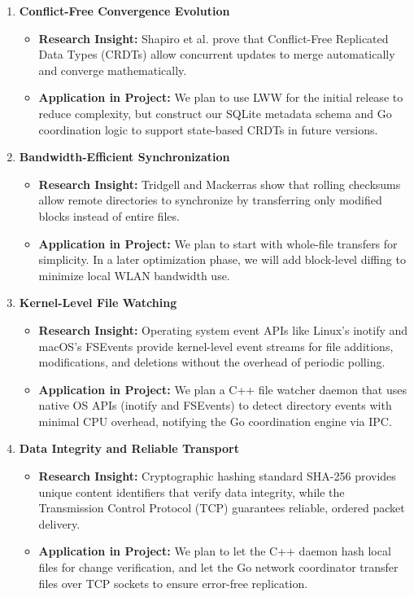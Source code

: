 \documentclass[11pt,oneside]{article}
\begin{document}
\begin{enumerate}
    \item \textbf{Conflict-Free Convergence Evolution}
    \begin{itemize}
        \item \textbf{Research Insight:} Shapiro et al. \cite{shapiro2011} prove that Conflict-Free Replicated Data Types (CRDTs) allow concurrent updates to merge automatically and converge mathematically.
        \item \textbf{Application in Project:} We plan to use LWW for the initial release to reduce complexity, but construct our SQLite metadata schema and Go coordination logic to support state-based CRDTs in future versions.
    \end{itemize}

    \item \textbf{Bandwidth-Efficient Synchronization}
    \begin{itemize}
        \item \textbf{Research Insight:} Tridgell and Mackerras \cite{rsync1996} show that rolling checksums allow remote directories to synchronize by transferring only modified blocks instead of entire files.
        \item \textbf{Application in Project:} We plan to start with whole-file transfers for simplicity. In a later optimization phase, we will add block-level diffing to minimize local WLAN bandwidth use.
    \end{itemize}

    \item \textbf{Kernel-Level File Watching}
    \begin{itemize}
        \item \textbf{Research Insight:} Operating system event APIs like Linux's inotify \cite{inotify7} and macOS's FSEvents \cite{fsevents} provide kernel-level event streams for file additions, modifications, and deletions without the overhead of periodic polling.
        \item \textbf{Application in Project:} We plan a C++ file watcher daemon that uses native OS APIs (inotify and FSEvents) to detect directory events with minimal CPU overhead, notifying the Go coordination engine via IPC.
    \end{itemize}

    \item \textbf{Data Integrity and Reliable Transport}
    \begin{itemize}
        \item \textbf{Research Insight:} Cryptographic hashing standard SHA-256 \cite{fips1804} provides unique content identifiers that verify data integrity, while the Transmission Control Protocol (TCP) \cite{rfc9293} guarantees reliable, ordered packet delivery.
        \item \textbf{Application in Project:} We plan to let the C++ daemon hash local files for change verification, and let the Go network coordinator transfer files over TCP sockets to ensure error-free replication.
    \end{itemize}
\end{enumerate}
\end{document}
